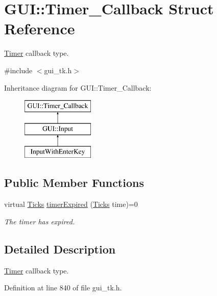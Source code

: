 \hypertarget{structGUI_1_1Timer__Callback}{\section{G\-U\-I\-:\-:Timer\-\_\-\-Callback Struct Reference}
\label{structGUI_1_1Timer__Callback}
}


\hyperlink{classGUI_1_1Timer}{Timer} callback type.  




{\ttfamily \#include $<$gui\-\_\-tk.\-h$>$}

Inheritance diagram for G\-U\-I\-:\-:Timer\-\_\-\-Callback\-:\begin{figure}[H]
\begin{center}
\leavevmode
\includegraphics[height=3.000000cm]{structGUI_1_1Timer__Callback}
\end{center}
\end{figure}
\subsection*{Public Member Functions}
\begin{DoxyCompactItemize}
\item 
virtual \hyperlink{namespaceGUI_af396fee5d5c26b98218f5803f85e3b65}{Ticks} \hyperlink{structGUI_1_1Timer__Callback_a4b5a610f3c4da4acd0bacda97b24e049}{timer\-Expired} (\hyperlink{namespaceGUI_af396fee5d5c26b98218f5803f85e3b65}{Ticks} time)=0
\begin{DoxyCompactList}\small\item\em The timer has expired. \end{DoxyCompactList}\end{DoxyCompactItemize}


\subsection{Detailed Description}
\hyperlink{classGUI_1_1Timer}{Timer} callback type. 

Definition at line 840 of file gui\-\_\-tk.\-h.



